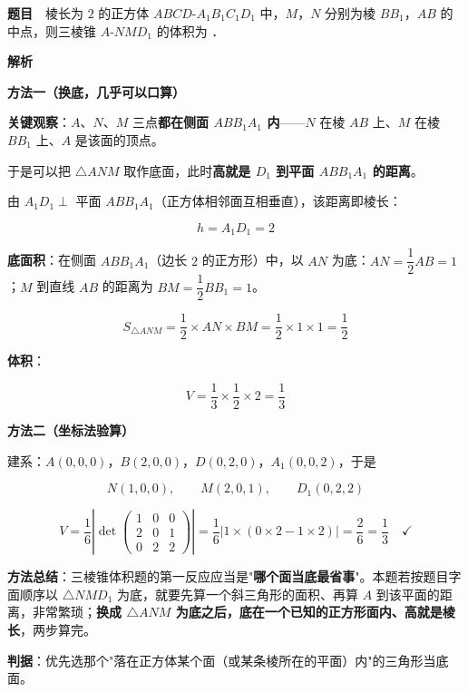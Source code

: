\par\medskip



\textbf{题目}　棱长为 $2$ 的正方体 $ABCD\text{-}A_1B_1C_1D_1$ 中，$M$，$N$ 分别为棱 $BB_1$，$AB$ 的中点，则三棱锥 $A\text{-}NMD_1$ 的体积为 \gkblank{}．

\textbf{解析}

\textbf{方法一（换底，几乎可以口算）}

\textbf{关键观察}：$A$、$N$、$M$ 三点\textbf{都在侧面 $ABB_1A_1$ 内}——$N$ 在棱 $AB$ 上、$M$ 在棱 $BB_1$ 上、$A$ 是该面的顶点。

于是可以把 $\triangle ANM$ 取作底面，此时\textbf{高就是 $D_1$ 到平面 $ABB_1A_1$ 的距离}。

由 $A_1D_1\perp$ 平面 $ABB_1A_1$（正方体相邻面互相垂直），该距离即棱长：

\[h=A_1D_1=2\]

\textbf{底面积}：在侧面 $ABB_1A_1$（边长 $2$ 的正方形）中，以 $AN$ 为底：$AN=\dfrac12AB=1$；$M$ 到直线 $AB$ 的距离为 $BM=\dfrac12BB_1=1$。

\[S_{\triangle ANM}=\frac12\times AN\times BM=\frac12\times1\times1=\frac12\]

\textbf{体积}：

\[V=\frac13\times\frac12\times2=\frac13\]

\textbf{方法二（坐标法验算）}

建系：$A(0,0,0)$，$B(2,0,0)$，$D(0,2,0)$，$A_1(0,0,2)$，于是

\[N(1,0,0),\qquad M(2,0,1),\qquad D_1(0,2,2)\]

\[V=\frac16\left|\det\begin{pmatrix}1&0&0\\2&0&1\\0&2&2\end{pmatrix}\right|=\frac16\left|1\times(0\times2-1\times2)\right|=\frac26=\frac13\quad\checkmark\]


\begin{gktip}
\textbf{方法总结}：三棱锥体积题的第一反应应当是"\textbf{哪个面当底最省事}"。本题若按题目字面顺序以 $\triangle NMD_1$ 为底，就要先算一个斜三角形的面积、再算 $A$ 到该平面的距离，非常繁琐；\textbf{换成 $\triangle ANM$ 为底之后，底在一个已知的正方形面内、高就是棱长}，两步算完。

\textbf{判据}：优先选那个"落在正方体某个面（或某条棱所在的平面）内"的三角形当底面。
\end{gktip}

